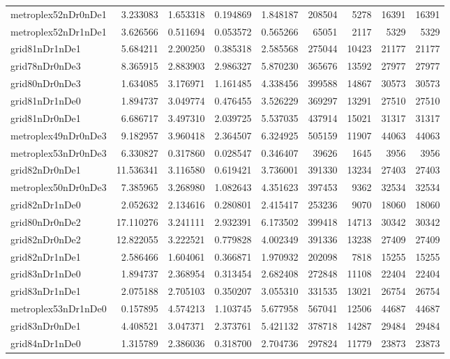 \documentclass[../../../thesis.tex]{subfiles}
\begin{document}
\begin{longtable}{|l|r|r|r|r|r|r|r|r|}
metroplex52nDr0nDe1 & 3.233083 & 1.653318 & 0.194869 & 1.848187 & 208504 & 5278 & 16391 & 16391 \\
metroplex52nDr1nDe1 & 3.626566 & 0.511694 & 0.053572 & 0.565266 & 65051 & 2117 & 5329 & 5329 \\
grid81nDr1nDe1 & 5.684211 & 2.200250 & 0.385318 & 2.585568 & 275044 & 10423 & 21177 & 21177 \\
grid78nDr0nDe3 & 8.365915 & 2.883903 & 2.986327 & 5.870230 & 365676 & 13592 & 27977 & 27977 \\
grid80nDr0nDe3 & 1.634085 & 3.176971 & 1.161485 & 4.338456 & 399588 & 14867 & 30573 & 30573 \\
grid81nDr1nDe0 & 1.894737 & 3.049774 & 0.476455 & 3.526229 & 369297 & 13291 & 27510 & 27510 \\
grid81nDr0nDe1 & 6.686717 & 3.497310 & 2.039725 & 5.537035 & 437914 & 15021 & 31317 & 31317 \\
metroplex49nDr0nDe3 & 9.182957 & 3.960418 & 2.364507 & 6.324925 & 505159 & 11907 & 44063 & 44063 \\
metroplex53nDr0nDe3 & 6.330827 & 0.317860 & 0.028547 & 0.346407 & 39626 & 1645 & 3956 & 3956 \\
grid82nDr0nDe1 & 11.536341 & 3.116580 & 0.619421 & 3.736001 & 391330 & 13234 & 27403 & 27403 \\
metroplex50nDr0nDe3 & 7.385965 & 3.268980 & 1.082643 & 4.351623 & 397453 & 9362 & 32534 & 32534 \\
grid82nDr1nDe0 & 2.052632 & 2.134616 & 0.280801 & 2.415417 & 253236 & 9070 & 18060 & 18060 \\
grid80nDr0nDe2 & 17.110276 & 3.241111 & 2.932391 & 6.173502 & 399418 & 14713 & 30342 & 30342 \\
grid82nDr0nDe2 & 12.822055 & 3.222521 & 0.779828 & 4.002349 & 391336 & 13238 & 27409 & 27409 \\
grid82nDr1nDe1 & 2.586466 & 1.604061 & 0.366871 & 1.970932 & 202098 & 7818 & 15255 & 15255 \\
grid83nDr1nDe0 & 1.894737 & 2.368954 & 0.313454 & 2.682408 & 272848 & 11108 & 22404 & 22404 \\
grid83nDr1nDe1 & 2.075188 & 2.705103 & 0.350207 & 3.055310 & 331535 & 13021 & 26754 & 26754 \\
metroplex53nDr1nDe0 & 0.157895 & 4.574213 & 1.103745 & 5.677958 & 567041 & 12506 & 44687 & 44687 \\
grid83nDr0nDe1 & 4.408521 & 3.047371 & 2.373761 & 5.421132 & 378718 & 14287 & 29484 & 29484 \\
grid84nDr1nDe0 & 1.315789 & 2.386036 & 0.318700 & 2.704736 & 297824 & 11779 & 23873 & 23873 \\

\end{longtable}
\end{document}
